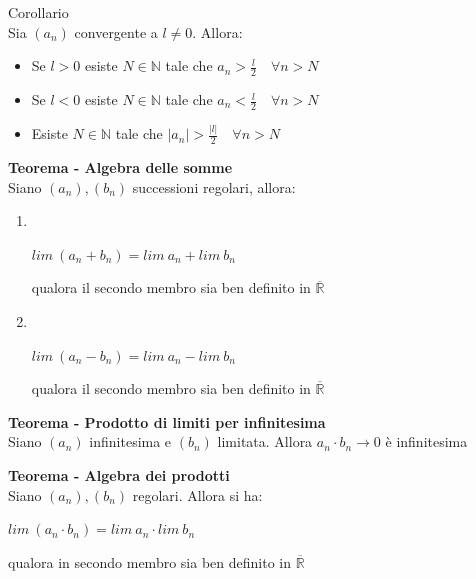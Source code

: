 \documentclass[12pt, a4paper]{article}
\begin{document}
    Corollario\\Sia $(a_{n})$ convergente a $l\neq 0$. Allora:
    \begin{itemize}
        \item Se $l>0$ esiste $N\in\mathbb{N}$ tale che $a_{n}>\frac{l}{2}\quad\forall n>N$
        \item Se $l<0$ esiste $N\in\mathbb{N}$ tale che $a_{n}<\frac{l}{2}\quad\forall n>N$
        \item Esiste $N\in\mathbb{N}$ tale che $|a_{n}|>\frac{|l|}{2}\quad\forall n>N$
    \end{itemize}

    \textbf{Teorema - Algebra delle somme}\\Siano $(a_{n}),(b_{n})$ successioni regolari, allora:
    \begin{enumerate}
        \item $\ $
              \begin{center}
                  $lim\ (a_{n}+b_{n})=lim\ a_{n} + lim\ b_{n}\qquad$
              \end{center}
              qualora il secondo membro sia ben definito in $\overline{\mathbb{R}}$
        \item $\ $
              \begin{center}
                  $lim\ (a_{n}-b_{n})=lim\ a_{n} - lim\ b_{n}\qquad$
              \end{center}
              qualora il secondo membro sia ben definito in $\overline{\mathbb{R}}$
    \end{enumerate}

    \textbf{Teorema - Prodotto di limiti per infinitesima}\\Siano $(a_{n})$ infinitesima e $(b_{n})$ limitata. Allora
$a_{n}\cdot b_{n}\to 0$ è infinitesima

    \textbf{Teorema - Algebra dei prodotti}\\Siano $(a_{n}),(b_{n})$ regolari. Allora si ha:
    \begin{center}
        $lim\ (a_{n}\cdot b_{n})=lim\ a_{n}\cdot lim\ b_{n}$
    \end{center}
    qualora in secondo membro sia ben definito in $\overline{\mathbb{R}}$
\end{document}
